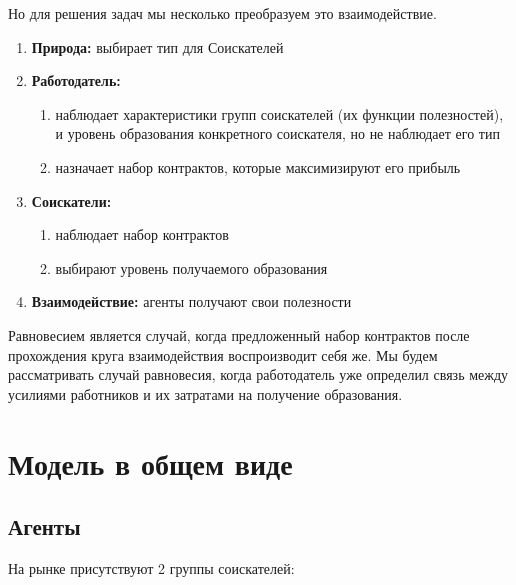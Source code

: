 \indent\setlength{\parindent}{1em}Но для решения задач мы несколько преобразуем это взаимодействие.

\begin{enumerate}
    \item \textbf{Природа:} выбирает тип для Соискателей
    \item \textbf{Работодатель:} \begin{enumerate}
        \item наблюдает характеристики групп соискателей (их функции полезностей), и уровень образования конкретного соискателя, но не наблюдает его тип
        \item назначает набор контрактов, которые максимизируют его прибыль
    \end{enumerate}
    \item \textbf{Соискатели:} \begin{enumerate}
        \item наблюдает набор контрактов
        \item выбирают уровень получаемого образования
    \end{enumerate}
    \item \textbf{Взаимодействие:} агенты получают свои полезности
\end{enumerate}

\indent\setlength{\parindent}{1em}Равновесием является случай, когда предложенный набор контрактов после прохождения
круга взаимодействия воспроизводит себя же. Мы будем рассматривать случай равновесия, когда работодатель уже
определил связь между усилиями работников и их затратами на получение образования.


\section{Модель в общем виде}

\subsection{Агенты}

\indent\setlength{\parindent}{1em}На рынке присутствуют 2 группы соискателей:

